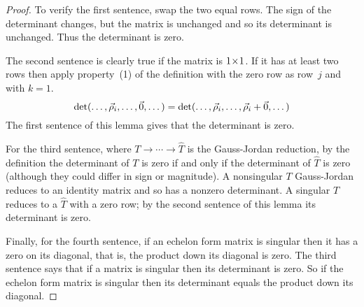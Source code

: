 \begin{proof}
To verify the first sentence, swap the two equal rows.
The sign of the determinant changes, but the matrix is unchanged
and so its determinant is unchanged.
Thus the determinant is zero.

The second sentence is clearly true if the matrix is \( 1 \! \times \! 1 \).
If it has at least two rows then apply property~(1) of the definition
with the zero row as row~$j$ and with $k=1$.
\begin{equation*}
   \det (\dots,\vec{\rho}_i,\dots,\vec{0},\dots)
   =\det (\dots,\vec{\rho}_i,\dots,\vec{\rho}_i+\vec{0},\dots)
\end{equation*}
The first sentence of this lemma gives that the determinant is zero.

For the third sentence, 
where $T \rightarrow\cdots\rightarrow\hat{T}$ is the
Gauss-Jordan reduction, by the definition
the determinant of $T$ is zero if and only if
the determinant of $\hat{T}$ is zero
(although they could differ in sign or magnitude).
A nonsingular $T$ Gauss-Jordan reduces to an identity matrix
and so has a nonzero determinant.
A singular $T$ reduces to a $\hat{T}$ with a zero row;
by the second sentence of this lemma its determinant is zero.

Finally,
for the fourth sentence, if an echelon form matrix is singular then
it has a zero on its diagonal, that is,
the product down its diagonal is zero.
The third sentence says that if a matrix is singular 
then its determinant is zero.
So if the echelon form matrix is singular then its determinant equals the
product down its diagonal.


\end{proof}
